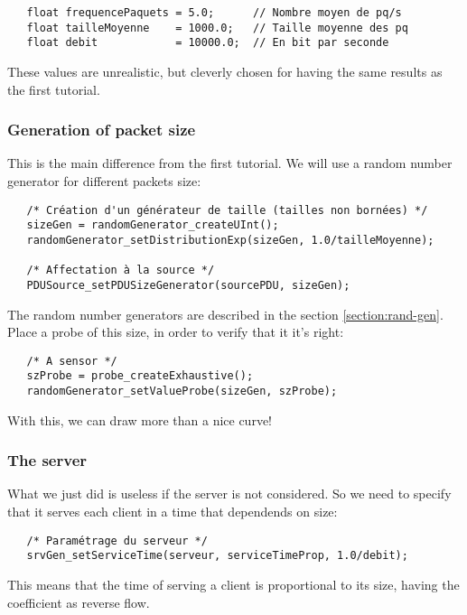 \begin{verbatim}
   float frequencePaquets = 5.0;      // Nombre moyen de pq/s
   float tailleMoyenne    = 1000.0;   // Taille moyenne des pq
   float debit            = 10000.0;  // En bit par seconde
\end{verbatim}

   These values ​​are unrealistic, but cleverly chosen for
having the same results as the first tutorial.   

%
\subsubsection{Generation of packet size}

   This is the main difference from the first tutorial. We will
use a random number generator for different packets size:

\begin{verbatim}
   /* Création d'un générateur de taille (tailles non bornées) */
   sizeGen = randomGenerator_createUInt();
   randomGenerator_setDistributionExp(sizeGen, 1.0/tailleMoyenne);

   /* Affectation à la source */
   PDUSource_setPDUSizeGenerator(sourcePDU, sizeGen);
\end{verbatim}

  The random number generators are described in the section
\ref{section:rand-gen}. Place a probe of this size, in order to verify that it it's right:


\begin{verbatim}
   /* A sensor */
   szProbe = probe_createExhaustive();
   randomGenerator_setValueProbe(sizeGen, szProbe);
\end{verbatim}

   With this, we can draw more than a nice curve!

%
\subsubsection{The server}

   What we just did is useless if the server is
not considered. So we need to specify that it serves each client
in a time that dependends on size:
   

\begin{verbatim}
   /* Paramétrage du serveur */
   srvGen_setServiceTime(serveur, serviceTimeProp, 1.0/debit);
\end{verbatim}
   
   This means that the time of serving a client is proportional to
its size, having the coefficient as reverse flow.


